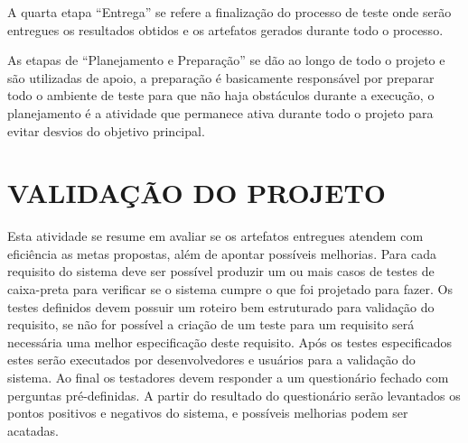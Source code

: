  A quarta etapa “Entrega” se refere a finalização do processo de teste onde serão entregues os resultados obtidos e os artefatos gerados durante todo o processo.
 
 
As etapas de “Planejamento e Preparação” se dão ao longo de todo o projeto e são utilizadas de apoio, a preparação é basicamente responsável por preparar todo o ambiente de teste para que não haja obstáculos durante a execução, o planejamento é a atividade que permanece ativa durante todo o projeto para evitar desvios do objetivo principal.

\section{VALIDAÇÃO DO PROJETO}


Esta atividade se resume em avaliar se os artefatos entregues atendem com eficiência as metas propostas, além de apontar possíveis melhorias. Para cada requisito do sistema deve ser possível produzir um ou mais casos de testes de caixa-preta para verificar se o sistema cumpre o que foi projetado para fazer. Os testes definidos devem possuir um roteiro bem estruturado para validação do requisito, se não for possível a criação de um teste para um requisito será necessária uma melhor especificação deste requisito. Após os testes especificados estes serão executados por desenvolvedores e usuários para a validação do sistema. Ao final os testadores devem responder a um questionário fechado com perguntas pré-definidas. A partir do resultado do questionário serão levantados os pontos positivos e negativos do sistema, e possíveis melhorias podem ser acatadas.
